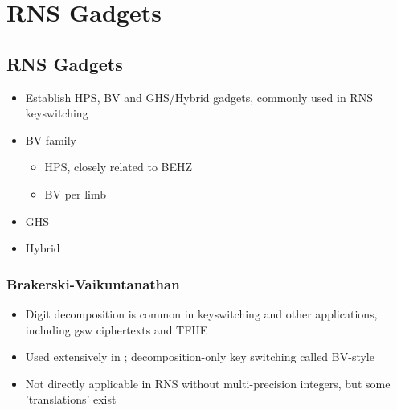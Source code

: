 \newif\iffable
\fabletrue    %

\chapter{RNS Gadgets}

\section{RNS Gadgets}
\iffable{
    \color{purple}
    \begin{itemize}
        \item Establish HPS, BV and GHS/Hybrid gadgets, commonly used in RNS keyswitching
        \item BV family
        \begin{itemize}
            \item HPS, closely related to BEHZ
            \item BV per limb 
        \end{itemize}
        \item GHS
        \item Hybrid
    \end{itemize}
}\fi

\subsection{Brakerski-Vaikuntanathan}
\begin{itemize}
    \item Digit decomposition is common in keyswitching and other applications, including \gls{gsw} ciphertexts and TFHE \cite{cryptoeprint:2012/099, cryptoeprint:2018/421, cryptoeprint:2011/277}
    \item Used extensively in \cite{BV}; decomposition-only key switching called BV-style
    \item Not directly applicable in RNS without multi-precision integers, but some 'translations' exist
\end{itemize}

